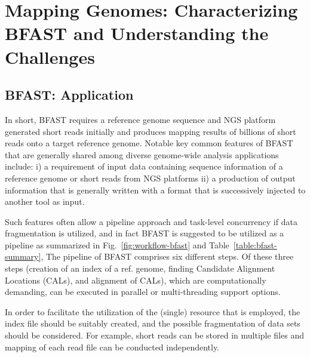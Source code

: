 \documentclass{acm_proc_article-sp}
\begin{document}
\section{Mapping Genomes: Characterizing BFAST and Understanding
  the Challenges}

\subsection{BFAST: Application}


In short, BFAST requires a reference genome sequence and NGS
platform generated short reads initially and produces mapping results
of billions of short reads onto a target reference genome.  Notable
key common features of BFAST that are generally shared among diverse genome-wide analysis applications include: i) a requirement of input data containing
sequence information of a reference genome or short reads from NGS
platforms ii) a production of output information that is generally
written with a format that is successively injected to another tool as
input.




Such features often allow a pipeline approach and task-level concurrency if data fragmentation is utilized, and in fact BFAST is suggested to be utilized as a pipeline as summarized in
Fig.~\ref{fig:workflow-bfast} and Table~\ref{table:bfast-summary},
The pipeline of BFAST comprises six different steps. Of these three steps (creation of an index of a
ref. genome, finding Candidate Alignment Locations (CALs), and alignment of CALs), which are computationally demanding, can be executed in
parallel or multi-threading support options.
 
In order to facilitate the utilization of the (single) resource that
is employed, the index file should be suitably created, and the possible
fragmentation of data sets should be considered.  For example, short reads can be stored in
multiple files and mapping of each read file can be conducted
independently.
 
\end{document}
